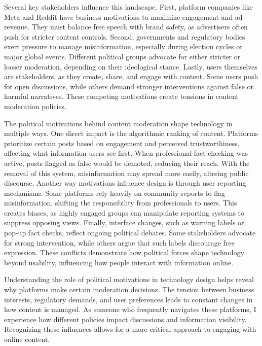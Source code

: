 \documentclass[
	letterpaper, %
]{jdf}
\begin{document}
Several key stakeholders influence this landscape. First, platform companies like Meta and Reddit have business motivations to maximize engagement and ad revenue. They must balance free speech with brand safety, as advertisers often push for stricter content controls. Second, governments and regulatory bodies exert pressure to manage misinformation, especially during election cycles or major global events. Different political groups advocate for either stricter or looser moderation, depending on their ideological stance. Lastly, users themselves are stakeholders, as they create, share, and engage with content. Some users push for open discussions, while others demand stronger interventions against false or harmful narratives. These competing motivations create tensions in content moderation policies.

The political motivations behind content moderation shape technology in multiple ways. One direct impact is the algorithmic ranking of content. Platforms prioritize certain posts based on engagement and perceived trustworthiness, affecting what information users see first. When professional fact-checking was active, posts flagged as false would be demoted, reducing their reach. With the removal of this system, misinformation may spread more easily, altering public discourse. Another way motivations influence design is through user reporting mechanisms. Some platforms rely heavily on community reports to flag misinformation, shifting the responsibility from professionals to users. This creates biases, as highly engaged groups can manipulate reporting systems to suppress opposing views. Finally, interface changes, such as warning labels or pop-up fact checks, reflect ongoing political debates. Some stakeholders advocate for strong intervention, while others argue that such labels discourage free expression. These conflicts demonstrate how political forces shape technology beyond usability, influencing how people interact with information online.

Understanding the role of political motivations in technology design helps reveal why platforms make certain moderation decisions. The tension between business interests, regulatory demands, and user preferences leads to constant changes in how content is managed. As someone who frequently navigates these platforms, I experience how different policies impact discussions and information visibility. Recognizing these influences allows for a more critical approach to engaging with online content.
\hfill \break
\end{document}
